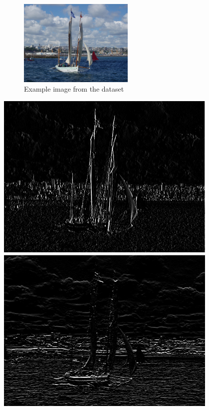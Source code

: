 \documentclass[12pt]{article}
\begin{document}
\begin{figure}[h]
	\centering
	\includegraphics[width=0.49\textwidth]{IAcBBqAmEI.jpg}
	\caption{Example image from the dataset}
\end{figure}

\begin{minipage}{\textwidth}
	\begin{minipage}{0.49\textwidth}
		\centering
		\includegraphics[width=0.8\textwidth]{IAcBBqAmEI_horizontal-0.jpeg}
		\includegraphics[width=0.8\textwidth]{IAcBBqAmEI_vertical-0.jpeg}

\end{minipage}
\end{minipage}
\end{document}
